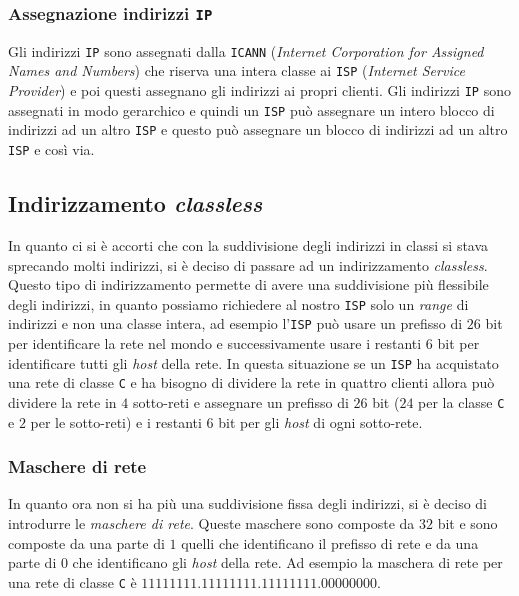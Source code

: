         \subsubsection{Assegnazione indirizzi \texttt{IP}}
            Gli indirizzi \texttt{IP} sono assegnati dalla \texttt{ICANN} (\textit{Internet Corporation for Assigned Names and Numbers}) che riserva una intera classe ai \texttt{ISP} (\textit{Internet Service Provider}) e poi questi assegnano gli indirizzi ai propri clienti. Gli indirizzi \texttt{IP} sono assegnati in modo gerarchico e quindi un \texttt{ISP} può assegnare un intero blocco di indirizzi ad un altro \texttt{ISP} e questo può assegnare un blocco di indirizzi ad un altro \texttt{ISP} e così via.
    \subsection{Indirizzamento \textit{classless}}
        In quanto ci si è accorti che con la suddivisione degli indirizzi in classi si stava sprecando molti indirizzi, si è deciso di passare ad un indirizzamento \textit{classless}. Questo tipo di indirizzamento permette di avere una suddivisione più flessibile degli indirizzi, in quanto possiamo richiedere al nostro \texttt{ISP} solo un \textit{range} di indirizzi e non una classe intera, ad esempio l'\texttt{ISP} può usare un prefisso di $26$ bit per identificare la rete nel mondo e successivamente usare i restanti $6$ bit per identificare tutti gli \textit{host} della rete.
        In questa situazione se un \texttt{ISP} ha acquistato una rete di classe \texttt{C} e ha bisogno di dividere la rete in quattro clienti allora può dividere la rete in $4$ sotto-reti e assegnare un prefisso di $26$ bit ($24$ per la classe \texttt{C} e $2$ per le sotto-reti) e i restanti $6$ bit per gli \textit{host} di ogni sotto-rete.
        \subsubsection{Maschere di rete}
            In quanto ora non si ha più una suddivisione fissa degli indirizzi, si è deciso di introdurre le \textit{maschere di rete}. Queste maschere sono composte da $32$ bit e sono composte da una parte di $1$ quelli che identificano il prefisso di rete e da una parte di $0$ che identificano gli \textit{host} della rete. Ad esempio la maschera di rete per una rete di classe \texttt{C} è $11111111.11111111.11111111.00000000$.
